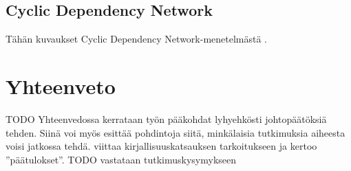\documentclass[utf8,bachelor,manualbib]{gradu3}
\begin{document}
\section{Cyclic Dependency Network}

Tähän kuvaukset Cyclic Dependency Network-menetelmästä \citep{toutanova2003}.


\chapter{Yhteenveto}

TODO Yhteenvedossa kerrataan työn pääkohdat lyhyehkösti johtopäätöksiä tehden. Siinä voi myös esittää pohdintoja siitä, minkälaisia tutkimuksia aiheesta voisi jatkossa tehdä. viittaa kirjallisuuskatsauksen tarkoitukseen ja kertoo ''päätulokset''.
TODO vastataan tutkimuskysymykseen
\end{document}
